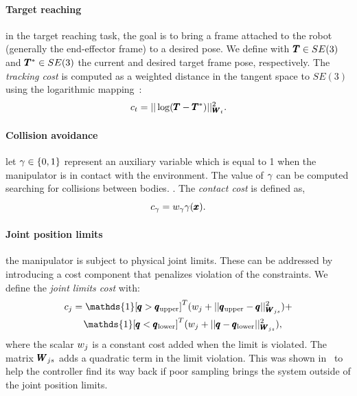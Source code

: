 \paragraph{Target reaching} in the target reaching task, the goal is to bring a frame attached to the robot (generally the end-effector frame) to a desired pose. We define with $\pmb{T} \in SE(3)$ and $\pmb{T}^* \in SE(3)$ the current and desired target frame pose, respectively. The \textit{tracking cost} is computed as a weighted distance in the tangent space to $SE(3)$ using the logarithmic mapping~\cite{blanco2010tutorial}:
\begin{equation} \label{eq:tracking_cost}
     c_{t} = || \log(\pmb{T} - \pmb{T}^{*}) ||^2_{\pmb{W}_{t}}.
 \end{equation}
 
 \paragraph{Collision avoidance} let $\gamma \in \{0, 1\}$ represent an auxiliary variable which is equal to 1 when the manipulator is in contact with the environment. The value of $\gamma$ can be computed searching for collisions between bodies. 
 . 
 The \textit{contact cost} is defined as,
 \begin{equation}
     c_{\gamma}= w_{\gamma} \gamma(\pmb{x}).
 \end{equation}

 \paragraph{Joint position limits} the manipulator is subject to physical joint limits. These can be addressed by introducing a cost component that penalizes violation of the constraints. We define the \textit{joint limits cost} with:
 \begin{align}
     &c_{j} = \mathds{1}[\configRobot > \upperLimits]^T(\weightScalar{j} + ||\upperLimits - \configRobot||^2_{\weightMatrix{js}}) + \nonumber\\ 
     &\qquad\mathds{1}[\configRobot < \lowerLimits]^T(\weightScalar{j} +  || \configRobot - \lowerLimits||^2_{\weightMatrix{js}}), 
 \end{align}
 where the scalar $w_{j}$ is a constant cost added when the limit is violated. The matrix $\pmb{W}_{js}$ adds a quadratic term in the limit violation. This was shown in~\cite{williams_information-theoretic_2018} to help the controller find its way back if poor sampling brings the system outside of the joint position limits.
 
